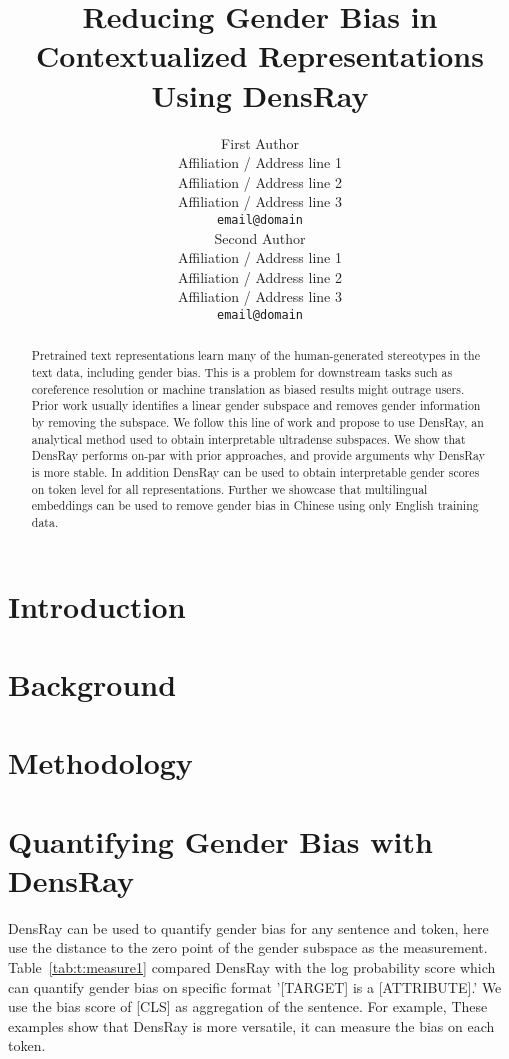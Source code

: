 \documentclass[11pt,a4paper]{article}
\title{Reducing Gender Bias in Contextualized Representations\\
	 Using DensRay}
\author{First Author \\
  Affiliation / Address line 1 \\
  Affiliation / Address line 2 \\
  Affiliation / Address line 3 \\
  \texttt{email@domain} \\\And
  Second Author \\
  Affiliation / Address line 1 \\
  Affiliation / Address line 2 \\
  Affiliation / Address line 3 \\
  \texttt{email@domain} \\}
\date{}
\def\tabref#1{Table~\ref{tab:#1}}
\begin{document}
\maketitle

\begin{abstract}
	Pretrained text representations learn many of the human-generated stereotypes in the text data, including gender bias. This is a problem for downstream tasks such as coreference resolution or machine translation as biased results might outrage users. Prior work usually identifies a linear gender subspace and removes gender information by removing the subspace. We follow this line of work and propose to use DensRay, an analytical method used to obtain interpretable ultradense subspaces. We show that DensRay performs on-par with prior approaches, and provide arguments why DensRay is more stable. In addition DensRay can be used to obtain interpretable gender scores on token level for all representations. Further we showcase that multilingual embeddings can be used to remove gender bias in Chinese using only English training data. 
\end{abstract}

\section{Introduction}


\section{Background}


\section{Methodology}


\section{Quantifying Gender Bias with DensRay}
DensRay can be used to quantify gender bias for any sentence and token, here use the distance to the zero point of the gender subspace as the measurement. \tabref{t:measure1} compared DensRay with the log probability score \citep{kurita2019measuring} which can quantify gender bias on specific format '[TARGET] is a [ATTRIBUTE].' We use the bias score of [CLS] as aggregation of the sentence. For example, These examples show that DensRay is more versatile, it can measure the bias on each token.
\end{document}

